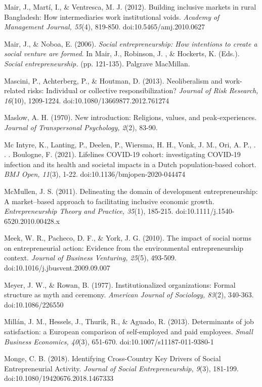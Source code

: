 \documentclass{article}
\begin{document}
Mair, J., Martí, I., \& Ventresca, M. J. (2012). Building inclusive markets in rural Bangladesh: How intermediaries work institutional voids. \emph{Academy of Management Journal, 55}(4), 819-850. doi:10.5465/amj.2010.0627

Mair, J., \& Noboa, E. (2006). \emph{Social entrepreneurship: How intentions to create a social venture are formed}. In Mair, J., Robinson, J. , \& Hockerts, K. (Eds.). \emph{Social entrepreneurship.} (pp. 121-135). Palgrave MacMillan.

Mascini, P., Achterberg, P., \& Houtman, D. (2013). Neoliberalism and work-related risks: Individual or collective responsibilization? \emph{Journal of Risk Research, 16}(10), 1209-1224. doi:10.1080/13669877.2012.761274

Maslow, A. H. (1970). New introduction: Religions, values, and peak-experiences. \emph{Journal of Transpersonal Psychology, 2}(2), 83-90. 

Mc Intyre, K., Lanting, P., Deelen, P., Wiersma, H. H., Vonk, J. M., Ori, A. P., . . . Boulogne, F. (2021). Lifelines COVID-19 cohort: investigating COVID-19 infection and its health and societal impacts in a Dutch population-based cohort. \emph{BMJ Open, 11}(3), 1-22. doi:10.1136/bmjopen-2020-044474

McMullen, J. S. (2011). Delineating the domain of development entrepreneurship: A market--based approach to facilitating inclusive economic growth. \emph{Entrepreneurship Theory and Practice, 35}(1), 185-215. doi:10.1111/j.1540-6520.2010.00428.x

Meek, W. R., Pacheco, D. F., \& York, J. G. (2010). The impact of social norms on entrepreneurial action: Evidence from the environmental entrepreneurship context. \emph{Journal of Business Venturing, 25}(5), 493-509. doi:10.1016/j.jbusvent.2009.09.007

Meyer, J. W., \& Rowan, B. (1977). Institutionalized organizations: Formal structure as myth and ceremony. \emph{American Journal of Sociology, 83}(2), 340-363. doi:10.1086/226550

Millán, J. M., Hessels, J., Thurik, R., \& Aguado, R. (2013). Determinants of job satisfaction: a European comparison of self-employed and paid employees. \emph{Small Business Economics, 40}(3), 651-670. doi:10.1007/s11187-011-9380-1

Monge, C. B. (2018). Identifying Cross-Country Key Drivers of Social Entrepreneurial Activity. \emph{Journal of Social Entrepreneurship, 9}(3), 181-199. doi:10.1080/19420676.2018.1467333
\end{document}
